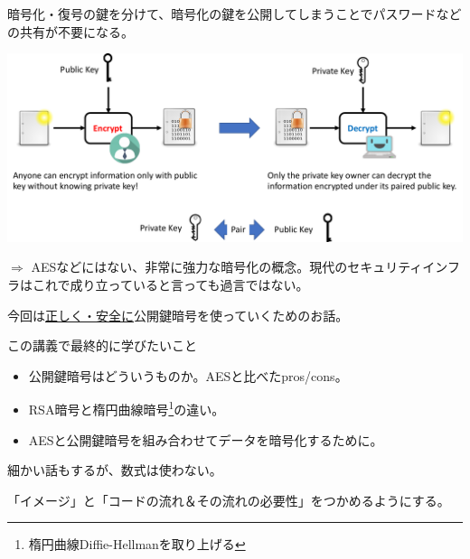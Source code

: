 \documentclass[12pt,dvipdfmx]{beamer}
\begin{document}
\begin{frame}

暗号化・復号の鍵を分けて、暗号化の鍵を公開してしまうことで\alert{パスワードなどの共有が不要}になる。

\begin{center}
\includegraphics[width=\linewidth]{Figs/pk_cryptosystem.pdf}
\end{center}

\vspace{1ex}

$\Rightarrow$ AESなどにはない、非常に強力な暗号化の概念。現代のセキュリティインフラはこれで成り立っていると言っても過言ではない。
\end{frame}

\begin{frame}
今回は\underline{正しく・安全に}公開鍵暗号を使っていくためのお話。

\begin{block}{\small この講義で最終的に学びたいこと}
\begin{itemize}
\item 公開鍵暗号はどういうものか。AESと比べたpros/cons。
\item RSA暗号と楕円曲線暗号\footnote[frame]{楕円曲線Diffie-Hellmanを取り上げる}の違い。
\item AESと公開鍵暗号を組み合わせてデータを暗号化するために。
\end{itemize}
\end{block}

細かい話もするが、数式は使わない。

「イメージ」と「コードの流れ＆その流れの必要性」をつかめるようにする。
\end{frame}


\end{document}
